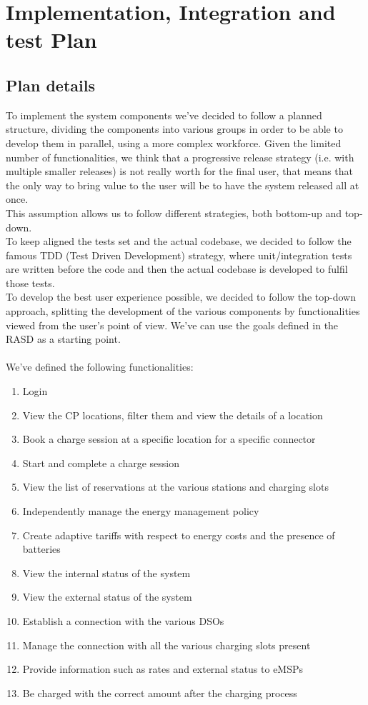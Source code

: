 \chapter{Implementation, Integration and test Plan}
\section{Plan details}
To implement the system components we've decided to follow a planned structure, dividing the components into various groups in order to be able to develop them in parallel, using a more complex workforce. Given the limited number of functionalities, we think that a progressive release strategy (i.e. with multiple smaller releases) is not really worth for the final user, that means that the only way to bring value to the user will be to have the system released all at once.\\
This assumption allows us to follow different strategies, both bottom-up and top-down. \\
To keep aligned the tests set and the actual codebase, we decided to follow the famous TDD (Test Driven Development) strategy, where unit/integration tests are written before the code and then the actual codebase is developed to fulfil those tests. \\
To develop the best user experience possible, we decided to follow the top-down approach, splitting the development of the various components by functionalities viewed from the user's point of view. We've can use the goals defined in the RASD as a starting point.\\\\
We've defined the following functionalities:
\begin{enumerate}
	\item Login
	\item View the CP locations, filter them and view the details of a location
	\item Book a charge session at a specific location for a specific connector
	\item Start and complete a charge session
	\item View the list of reservations at the various stations and charging slots
	\item Independently manage the energy management policy
	\item Create adaptive tariffs with respect to energy costs and the presence of batteries
	\item View the internal status of the system
	\item View the external status of the system
	\item Establish a connection with the various DSOs
	\item Manage the connection with all the various charging slots present
	\item Provide information such as rates and external status to eMSPs
	\item Be charged with the correct amount after the charging process\\
\end{enumerate}

